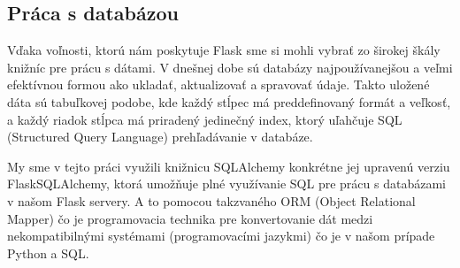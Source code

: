 \subsection{Práca s databázou}
Vďaka voľnosti, ktorú nám poskytuje Flask sme si mohli vybrať zo širokej škály knižníc pre prácu s dátami. V dnešnej dobe sú databázy najpoužívanejšou a veľmi efektívnou formou ako ukladať, aktualizovať a spravovať údaje. Takto uložené dáta sú tabuľkovej podobe, kde každý stĺpec má preddefinovaný formát a veľkosť, a každý riadok stĺpca má priradený jedinečný index, ktorý uľahčuje SQL (Structured Query Language) prehľadávanie v databáze.

My sme v tejto práci využili knižnicu SQLAlchemy konkrétne jej upravenú verziu FlaskSQLAlchemy, ktorá umožňuje plné využívanie SQL pre prácu s databázami v našom Flask servery. A to pomocou takzvaného ORM (Object Relational Mapper) čo je programovacia technika pre konvertovanie dát medzi nekompatibilnými systémami (programovacími jazykmi) čo je v našom prípade Python a SQL. 

